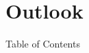 \documentclass[xcolor=svgnames,english]{beamer}
\newcommand{\cmark}{\ding{51}}%
\newcommand{\xmark}{\ding{55}}%
\newcommand{\done}{\rlap{$\square$}{\raisebox{2pt}{\large\hspace{1pt}\cmark}}%
\hspace{-2.5pt}}
\newcommand{\wontfix}{\rlap{$\square$}{\large\hspace{1pt}\xmark}}
\begin{document}
\section{Outlook}
\begin{frame}{Table of Contents}
\end{frame}

%  
\end{document}
